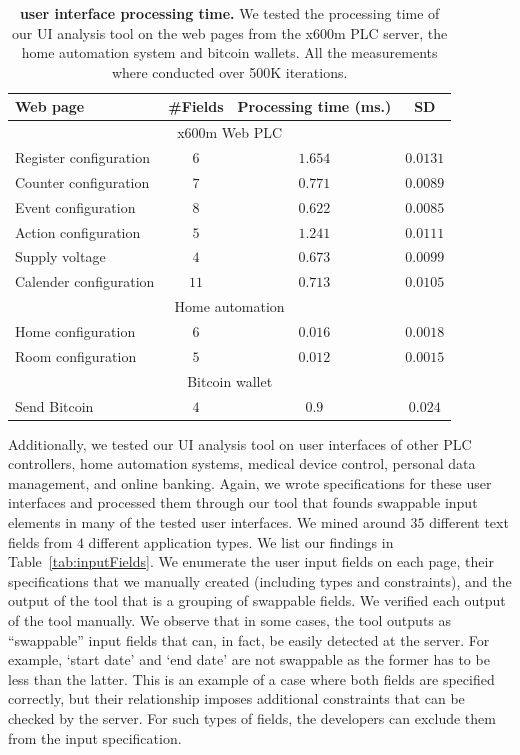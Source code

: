 \begin{table}[t]
\centering
\small
\caption[\tool user interface processing time]{\textbf{\tool user interface processing time.} We tested the processing time of our UI analysis tool on the web pages from the x600m PLC server, the home automation system and bitcoin wallets. All the measurements where conducted over 500K iterations.}
\begin{tabular}{lccc}
\textbf{Web page} & \textbf{\#Fields} &\textbf{Processing time (ms.)} & \textbf{SD}\\ \toprule
\multicolumn{4}{c}{x600m Web PLC} \\ \midrule
Register configuration & $6$ & $1.654$ & $0.0131$\\ 
Counter configuration & $7$ & $0.771$ & $0.0089$\\ 
Event configuration & $8$ & $0.622$ & $0.0085$\\ 
Action configuration & $5$ & $1.241$ & $0.0111$\\ 
Supply voltage & $4$ & $0.673$ & $0.0099$\\ 
Calender configuration & $11$ & $0.713$ & $0.0105$\\ \midrule
\multicolumn{4}{c}{Home automation} \\ \midrule
Home configuration & $6$ & $0.016$ & $0.0018$\\ 
Room configuration & $5$ & $0.012$ & $0.0015$\\ 
\hline
\multicolumn{4}{c}{Bitcoin wallet} \\ \midrule
Send Bitcoin & $4$ & $0.9$ & $0.024$\\ 
\bottomrule
\end{tabular}


\label{tab:frameworkPerformance}
\end{table}


Additionally, we tested our UI analysis tool on user interfaces of other PLC controllers, home automation systems, medical device control, personal data management, and online banking. Again, we wrote specifications for these user interfaces and processed them through our tool that founds swappable input elements in many of the tested user interfaces. We mined around $35$ different text fields from $4$ different application types. We list our findings in Table~\ref{tab:inputFields}. We enumerate the user input fields on each page, their specifications that we manually created (including types and constraints), and the output of the tool that is a grouping of swappable fields. We verified each output of the tool manually. We observe that in some cases, the tool outputs as ``swappable'' input fields that can, in fact, be easily detected at the server. For example, `start date' and `end date' are not swappable as the former has to be less than the latter. This is an example of a case where both fields are specified correctly, but their relationship imposes additional constraints that can be checked by the server. For such types of fields, the developers can exclude them from the input specification.

